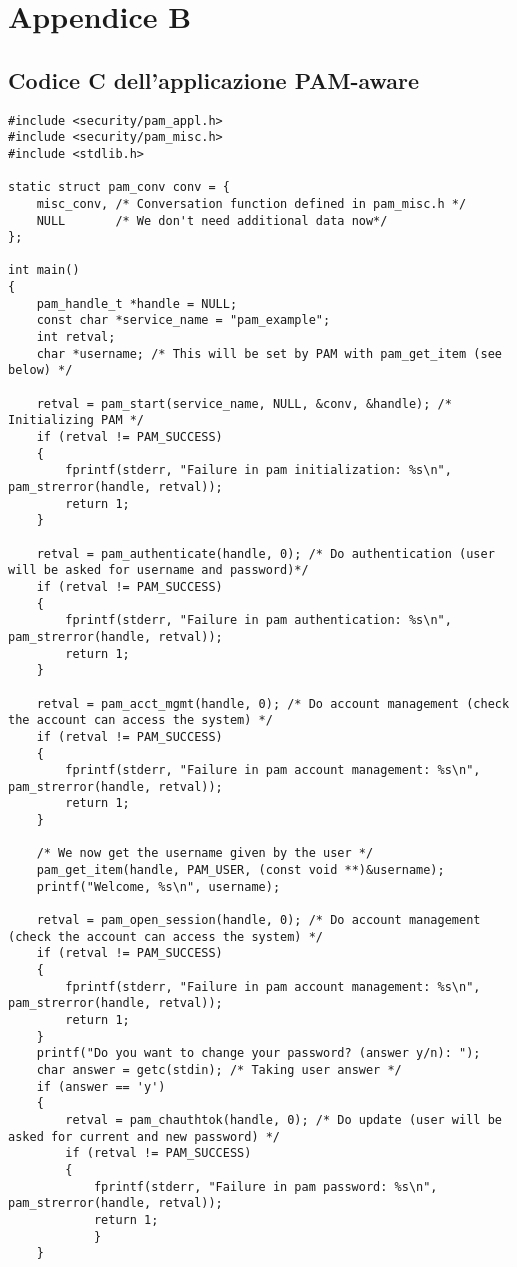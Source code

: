 
\chapter{Appendice B}

\section{Codice C dell'applicazione PAM-aware}

\lstset {language=C}
\begin{lstlisting}
#include <security/pam_appl.h>
#include <security/pam_misc.h>
#include <stdlib.h>

static struct pam_conv conv = {
    misc_conv, /* Conversation function defined in pam_misc.h */
    NULL       /* We don't need additional data now*/
};

int main()
{
    pam_handle_t *handle = NULL;
    const char *service_name = "pam_example";
    int retval;
    char *username; /* This will be set by PAM with pam_get_item (see below) */

    retval = pam_start(service_name, NULL, &conv, &handle); /* Initializing PAM */
    if (retval != PAM_SUCCESS)
    {
        fprintf(stderr, "Failure in pam initialization: %s\n", pam_strerror(handle, retval));
        return 1;
    }

    retval = pam_authenticate(handle, 0); /* Do authentication (user will be asked for username and password)*/
    if (retval != PAM_SUCCESS)
    {
        fprintf(stderr, "Failure in pam authentication: %s\n", pam_strerror(handle, retval));
        return 1;
    }
    
    retval = pam_acct_mgmt(handle, 0); /* Do account management (check the account can access the system) */
    if (retval != PAM_SUCCESS)
    {
        fprintf(stderr, "Failure in pam account management: %s\n", pam_strerror(handle, retval));
        return 1;
    }

    /* We now get the username given by the user */
    pam_get_item(handle, PAM_USER, (const void **)&username);
    printf("Welcome, %s\n", username);

    retval = pam_open_session(handle, 0); /* Do account management (check the account can access the system) */
    if (retval != PAM_SUCCESS)
    {
        fprintf(stderr, "Failure in pam account management: %s\n", pam_strerror(handle, retval));
        return 1;
    }
    printf("Do you want to change your password? (answer y/n): ");
    char answer = getc(stdin); /* Taking user answer */
    if (answer == 'y')
    {
        retval = pam_chauthtok(handle, 0); /* Do update (user will be asked for current and new password) */
        if (retval != PAM_SUCCESS)
        {
            fprintf(stderr, "Failure in pam password: %s\n", pam_strerror(handle, retval));
            return 1;
            }
    }


\end{lstlisting}
